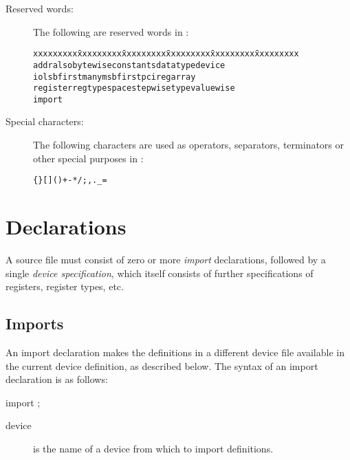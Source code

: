 \documentclass[a4paper,11pt,twoside]{report}
\begin{document}
\begin{description}
\item[Reserved words:] The following are reserved words in \Mac:
\begin{alltt}
  \begin{tabbing}
xxxxxxxxx \= xxxxxxxxx \= xxxxxxxxx \= xxxxxxxxx \= xxxxxxxxx \= xxxxxxxxx \kill
addr \> also \> bytewise \> constants \> datatype \> device \\
io \> lsbfirst \> many \> msbfirst \> pci \> regarray  \\
register \> regtype \> space \> stepwise \> type \> valuewise \\
import 
  \end{tabbing}
\end{alltt}

\item[Special characters:] The following characters are used as operators,
  separators, terminators or other special purposes in \Mac:
\begin{alltt}

  \{ \} [ ] ( ) + - * / ; , . _ = 

\end{alltt}

\end{description}

\chapter{Declarations}\label{chap:declarations}

A \Mac source file must consist of zero or more \textit{import}
declarations, followed by a single \textit{device
  specification}, which itself consists of further specifications of
registers, register types, etc. 

\section{Imports}\label{sec:imports}

An import declaration makes the definitions in a different device file
available in the current device definition, as described below.  The
syntax of an import declaration is as follows:

\begin{syntax}
import ;
\end{syntax}

\begin{description}
\item[device] is the name of a device from which to import
  definitions.  
\end{description}
\end{document}
